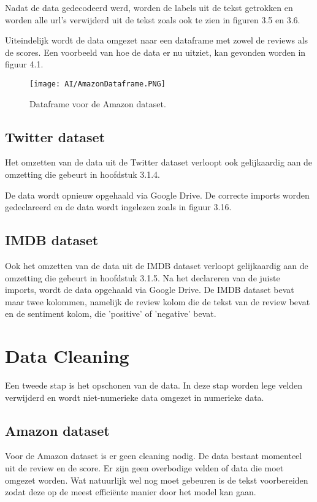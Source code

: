 Nadat de data gedecodeerd werd, worden de labels uit de tekst getrokken en worden alle url's verwijderd uit de tekst zoals ook te zien in figuren 3.5 en 3.6. 

Uiteindelijk wordt de data omgezet naar een dataframe met zowel de reviews als de scores. Een voorbeeld van hoe de data er nu uitziet, kan gevonden worden in figuur 4.1.

\begin{figure}[!htbp]
    \texttt{[image: AI/AmazonDataframe.PNG]}
    \caption{\label{amazondataframe}Dataframe voor de Amazon dataset.}
\end{figure}
\FloatBarrier 

\subsection{Twitter dataset}
Het omzetten van de data uit de Twitter dataset verloopt ook gelijkaardig aan de omzetting die gebeurt in hoofdstuk 3.1.4.

De data wordt opnieuw opgehaald via Google Drive. De correcte imports worden gedeclareerd en de data wordt ingelezen zoals in figuur 3.16.

\subsection{IMDB dataset}
Ook het omzetten van de data uit de IMDB dataset verloopt gelijkaardig aan de omzetting die gebeurt in hoofdstuk 3.1.5.
Na het declareren van de juiste imports, wordt de data opgehaald via Google Drive. De IMDB dataset bevat maar twee kolommen, namelijk de review kolom die de tekst van de review bevat en de sentiment kolom, die 'positive' of 'negative' bevat. 

\section{Data Cleaning}
\label{proofofconceptdatacleaning}
Een tweede stap is het opschonen van de data. In deze stap worden lege velden verwijderd en wordt niet-numerieke data omgezet in numerieke data.

\subsection{Amazon dataset}
Voor de Amazon dataset is er geen cleaning nodig. De data bestaat momenteel uit de review en de score. Er zijn geen overbodige velden of data die moet omgezet worden. Wat natuurlijk wel nog moet gebeuren is de tekst voorbereiden zodat deze op de meest efficiënte manier door het model kan gaan.

